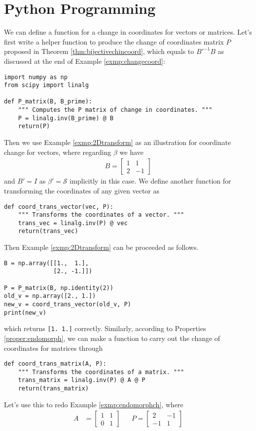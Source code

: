 \section{Python Programming}
We can define a function for a change in coordinates for vectors or matrices. Let's first write a helper function to produce the change of coordinates matrix $P$ proposed in Theorem \ref{thm:bijectivechincoord}, which equals to $B'^{-1}B$ as discussed at the end of Example \ref{exmp:changecoord}:
\begin{lstlisting}
import numpy as np
from scipy import linalg

def P_matrix(B, B_prime):
    """ Computes the P matrix of change in coordinates. """
    P = linalg.inv(B_prime) @ B
    return(P)
\end{lstlisting}
Then we use Example \ref{exmp:2Dtransform} as an illustration for coordinate change for vectors, where regarding $\mathcal{\beta}$ we have
\begin{align*}
B = 
\begin{bmatrix}
1 & 1 \\ 
2 & -1
\end{bmatrix}
\end{align*}
and $B' = I$ as $\mathcal{\beta}' = \mathcal{S}$ implicitly in this case. We define another function for transforming the coordinates of any given vector as
\begin{lstlisting}
def coord_trans_vector(vec, P):
    """ Transforms the coordinates of a vector. """
    trans_vec = linalg.inv(P) @ vec
    return(trans_vec)    
\end{lstlisting}
Then Example \ref{exmp:2Dtransform} can be proceeded as follows.
\begin{lstlisting}
B = np.array([[1.,  1.], 
              [2., -1.]])

P = P_matrix(B, np.identity(2))
old_v = np.array([2., 1.])
new_v = coord_trans_vector(old_v, P)
print(new_v)    
\end{lstlisting}
which returns \verb|[1. 1.]| correctly. Similarly, according to Properties \ref{proper:endomorph}, we can make a function to carry out the change of coordinates for matrices through
\begin{lstlisting}
def coord_trans_matrix(A, P):
    """ Transforms the coordinates of a matrix. """
    trans_matrix = linalg.inv(P) @ A @ P
    return(trans_matrix)    
\end{lstlisting}
Let's use this to redo Example \ref{exmp:endomorphch}, where
\begin{align*}
A &= 
\begin{bmatrix}
1 & 1 \\
0 & 1
\end{bmatrix} &
& P=
\begin{bmatrix}
2 & -1 \\
-1 & 1
\end{bmatrix}
\end{align*}
